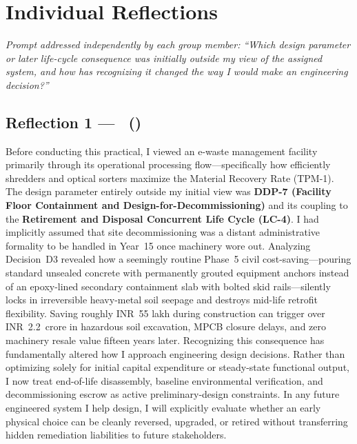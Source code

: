 \section{Individual Reflections}
\label{sec:L}

\textit{Prompt addressed independently by each group member: ``Which design parameter or later life-cycle consequence was initially outside my view of the assigned system, and how has recognizing it changed the way I would make an engineering decision?''}

\subsection{Reflection 1 --- \memberOneName\ (\texttt{\memberOneRoll})}
Before conducting this practical, I viewed an e-waste management facility primarily through its operational processing flow---specifically how efficiently shredders and optical sorters maximize the Material Recovery Rate (TPM-1). The design parameter entirely outside my initial view was \textbf{DDP-7 (Facility Floor Containment and Design-for-Decommissioning)} and its coupling to the \textbf{Retirement and Disposal Concurrent Life Cycle (LC-4)}. I had implicitly assumed that site decommissioning was a distant administrative formality to be handled in Year~15 once machinery wore out. Analyzing Decision~D3 revealed how a seemingly routine Phase~5 civil cost-saving---pouring standard unsealed concrete with permanently grouted equipment anchors instead of an epoxy-lined secondary containment slab with bolted skid rails---silently locks in irreversible heavy-metal soil seepage and destroys mid-life retrofit flexibility. Saving roughly INR~55 lakh during construction can trigger over INR~2.2~crore in hazardous soil excavation, MPCB closure delays, and zero machinery resale value fifteen years later. Recognizing this consequence has fundamentally altered how I approach engineering design decisions. Rather than optimizing solely for initial capital expenditure or steady-state functional output, I now treat end-of-life disassembly, baseline environmental verification, and decommissioning escrow as active preliminary-design constraints. In any future engineered system I help design, I will explicitly evaluate whether an early physical choice can be cleanly reversed, upgraded, or retired without transferring hidden remediation liabilities to future stakeholders.

